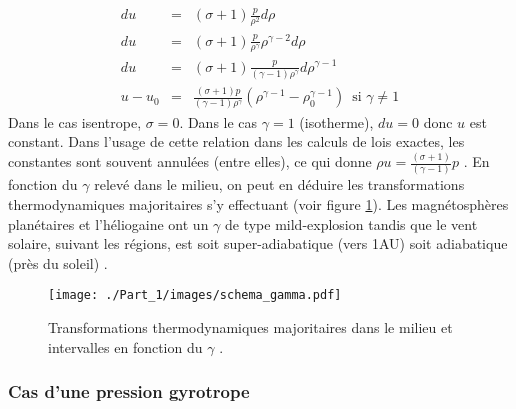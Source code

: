 \begin{eqnarray}
d u &=& (\sigma+1) \frac{p}{\rho^2} d \rho \\
   d u &=& (\sigma+1) \frac{p}{\rho^{\gamma}} \rho^{\gamma-2} d \rho \\
   d u &=&  (\sigma+1) \frac{p}{(\gamma-1)\rho^{\gamma}} d \rho^{\gamma-1} \\
   u - u_0 &=& \frac{(\sigma+1) p}{(\gamma-1)\rho^{\gamma}} (\rho^{\gamma-1} - \rho_0^{\gamma-1}) \, \textrm{ si }  \gamma \neq 1 
\end{eqnarray}
Dans le cas isentrope, $\sigma = 0$. Dans le cas $\gamma = 1$ (isotherme), $du = 0$ donc $u$ est constant. Dans l'usage de cette relation dans les calculs de lois exactes, les constantes sont souvent annulées (entre elles), ce qui donne $ \rho u = \frac{(\sigma+1)}{(\gamma-1)} p $ \cite{banerjee_kolmogorov-like_2014}. En fonction du $\gamma$ relevé dans le milieu, on peut en déduire les transformations thermodynamiques majoritaires s'y effectuant (voir figure \ref{fig:schema_gamma}). Les magnétosphères planétaires et l'héliogaine ont un $\gamma$ de type mild-explosion tandis que le vent solaire, suivant les régions, est soit super-adiabatique (vers 1AU) soit adiabatique (près du soleil) \cite{livadiotis_long-term_2018}.

\begin{figure}[!h]
 \centering
\texttt{[image: ./Part\_1/images/schema\_gamma.pdf]}
\caption{Transformations thermodynamiques majoritaires dans le milieu et intervalles en fonction du $\gamma$ \cite{livadiotis_long-term_2018}.}
\label{fig:schema_gamma}
\end{figure}

\subsubsection{Cas d'une pression gyrotrope}

